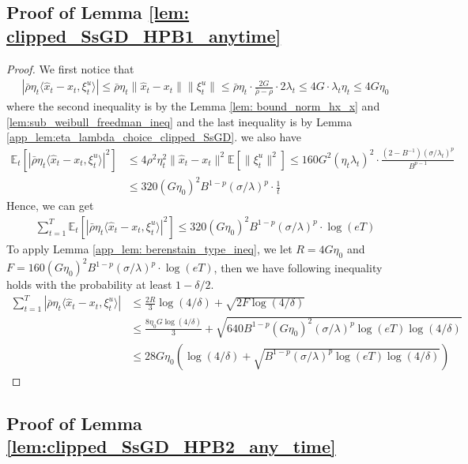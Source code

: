 \documentclass{article}
\def \E {\mathbb{E}}
\def \brho {\bar{\rho}}
\def \hx {\hat{x}}
\begin{document}
\subsection{Proof of Lemma \ref{lem: clipped_SsGD_HPB1_anytime}}
\begin{proof}
    We first notice that 
    \begin{align}
        |\brho\eta_t\langle\hx_t-x_t,\xi_t^u\rangle|\leq \brho\eta_t\|\hx_t-x_t\|\|\xi_t^u\|\leq \brho\eta_t\cdot\frac{2G}{\brho-\rho}\cdot2\lambda_t\leq 4G\cdot\lambda_t\eta_t\leq 4G\eta_0
    \end{align}
where the second inequality is by the Lemma \ref{lem: bound_norm_hx_x} and \ref{lem:sub_weibull_freedman_ineq} and the last inequality is by Lemma \ref{app_lem:eta_lambda_choice_clipped_SsGD}.
we also have
\begin{align}
    \E_t[|\brho\eta_t\langle\hx_t-x_t,\xi_t^u\rangle|^2]&\leq 4\rho^2\eta_t^2\|\hx_t-x_t\|^2\E[\|\xi_t^u\|^2]\leq 160G^2(\eta_t\lambda_t)^2\cdot\frac{(2-B^{-1})(\sigma/\lambda_t)^p}{B^{p-1}}\nonumber\\
    &\leq 320(G\eta_0)^2B^{1-p}(\sigma/\lambda)^p\cdot\frac{1}{t}
\end{align}
Hence, we can get
\begin{align}
    \sum_{t=1}^T \E_t[|\brho\eta_t\langle\hx_t-x_t,\xi_t^u\rangle|^2] \leq 320(G\eta_0)^2B^{1-p}(\sigma/\lambda)^p\cdot\log(eT)
\end{align}
To apply Lemma \ref{app_lem: berenstain_type_ineq}, we let $R = 4G\eta_0$ and $F=160(G\eta_0)^2B^{1-p}(\sigma/\lambda)^p\cdot\log(eT)$, then we have following inequality holds with the probability at least $1-\delta/2$.
\begin{align}
    \sum_{t=1}^T |\brho\eta_t\langle\hx_t-x_t,\xi_t^u\rangle|&\leq \frac{2R}{3}\log(4/\delta) + \sqrt{2F\log(4/\delta)}\nonumber\\
    &\leq \frac{8\eta_0G\log(4/\delta)}{3} + \sqrt{640 B^{1-p}(G\eta_0)^2(\sigma/\lambda)^p\log(eT)\log(4/\delta)}\nonumber\\
    &\leq 28G\eta_0\left(\log(4/\delta)+\sqrt{B^{1-p}(\sigma/\lambda)^p\log(eT)\log(4/\delta)}\right)
\end{align}

\end{proof}
 
\subsection{Proof of Lemma \ref{lem:clipped_SsGD_HPB2_any_time}}
\end{document}
